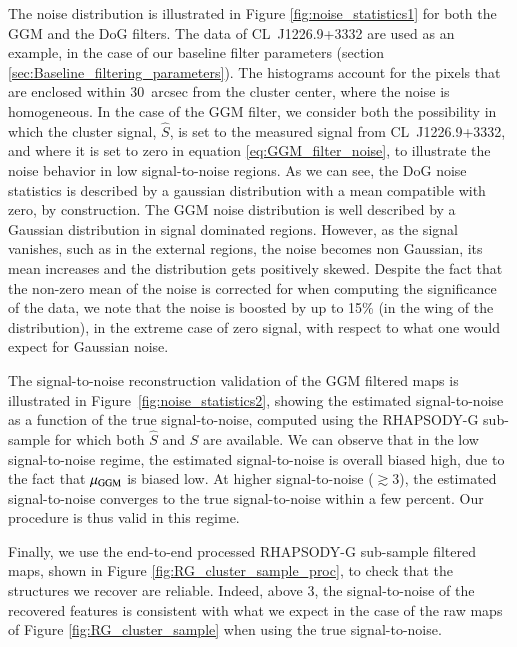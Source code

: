 \documentclass[twocolumn,traditabstract]{aa}
\begin{document}
The noise distribution is illustrated in Figure \ref{fig:noise_statistics1} for both the GGM and the DoG filters. The data of \mbox{CL~J1226.9+3332} are used as an example, in the case of our baseline filter parameters (section \ref{sec:Baseline_filtering_parameters}). The histograms account for the pixels that are enclosed within 30~arcsec from the cluster center, where the noise is homogeneous. In the case of the GGM filter, we consider both the possibility in which the cluster signal, $\hat{S}$, is set to the measured signal from \mbox{CL~J1226.9+3332}, and where it is set to zero in equation \ref{eq:GGM_filter_noise}, to illustrate the noise behavior in low signal-to-noise regions. As we can see, the DoG noise statistics is described by a gaussian distribution with a mean compatible with zero, by construction. The GGM noise distribution is well described by a Gaussian distribution in signal dominated regions. However, as the signal vanishes, such as in the external regions, the noise becomes non Gaussian, its mean increases and the distribution gets positively skewed. Despite the fact that the non-zero mean of the noise is corrected for when computing the significance of the data, we note that the noise is boosted by up to 15\% (in the wing of the distribution), in the extreme case of zero signal, with respect to what one would expect for Gaussian noise.

The signal-to-noise reconstruction validation of the GGM filtered maps is illustrated in Figure~\ref{fig:noise_statistics2}, showing the estimated signal-to-noise as a function of the true signal-to-noise, computed using the RHAPSODY-G sub-sample for which both $\hat{S}$ and $S$ are available. We can observe that in the low signal-to-noise regime, the estimated signal-to-noise is overall biased high, due to the fact that $\mu_{\rm GGM}$ is biased low. At higher signal-to-noise ($\gtrsim 3$), the estimated signal-to-noise converges to the true signal-to-noise within a few percent. Our procedure is thus valid in this regime.

Finally, we use the end-to-end processed RHAPSODY-G sub-sample filtered maps, shown in Figure \ref{fig:RG_cluster_sample_proc}, to check that the structures we recover are reliable. Indeed, above 3, the signal-to-noise of the recovered features is consistent with what we expect in the case of the raw maps of Figure \ref{fig:RG_cluster_sample} when using the true signal-to-noise.
\end{document}
